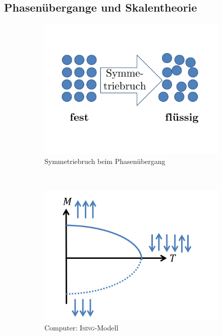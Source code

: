 \documentclass[12pt]{article}
\begin{document}
\subsection{Phasenübergange und Skalentheorie}

\begin{figure}[h] 
		\begin{subfigure}[h]{0.5 \textwidth}
		\centering
		\includegraphics[width=\textwidth]{Folie33.png}
		\caption{Symmetriebruch beim Phasenübergang} 
		\label{fig:Symmetriebruch}
		\centering
	\end{subfigure}
	~
\begin{subfigure}[h]{0.5\textwidth}
		\centering
		\includegraphics[width=\textwidth]{Folie34.png}
		\caption{Computer: \textsc{Ising}-Modell}
		\label{fig:Computer}
		\centering
	\end{subfigure}
	\caption{ }
\end{figure}	
\end{document}
